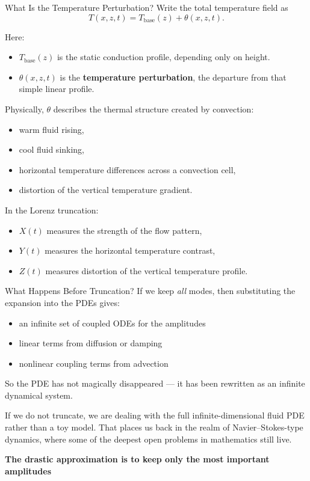 \documentclass[aspectratio=169]{beamer}
\begin{document}
\begin{frame}{What Is the Temperature Perturbation?}
Write the total temperature field as
\begin{equation*}
T(x,z,t)=T_{\text{base}}(z)+\theta(x,z,t).
\end{equation*}

Here:
\begin{itemize}
\item $T_{\text{base}}(z)$ is the static conduction profile, depending only on height.
\item $\theta(x,z,t)$ is the \textbf{temperature perturbation}, the departure from that simple linear profile.
\end{itemize}

Physically, $\theta$ describes the thermal structure created by convection:
\begin{itemize}
\item warm fluid rising,
\item cool fluid sinking,
\item horizontal temperature differences across a convection cell,
\item distortion of the vertical temperature gradient.
\end{itemize}

In the Lorenz truncation:
\begin{itemize}
\item $X(t)$ measures the strength of the flow pattern,
\item $Y(t)$ measures the horizontal temperature contrast,
\item $Z(t)$ measures distortion of the vertical temperature profile.
\end{itemize}
\end{frame}

\begin{frame}{What Happens Before Truncation?}
If we keep \emph{all} modes, then substituting the expansion into the PDEs gives:
\begin{itemize}
\item an infinite set of coupled ODEs for the amplitudes
\item linear terms from diffusion or damping
\item nonlinear coupling terms from advection
\end{itemize}

So the PDE has not magically disappeared --- it has been rewritten as an infinite dynamical system.  

If we do not truncate, we are dealing with the full infinite-dimensional fluid PDE rather than a toy model. That places us back in the realm of Navier–Stokes-type dynamics, where some of the deepest open problems in mathematics still live.

\vspace{0.5em}
\center
\textbf{The drastic approximation is to keep only the most important amplitudes}
\end{frame}
\end{document}
